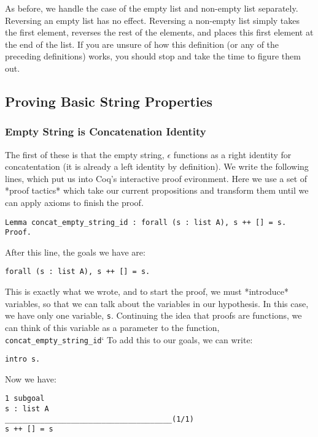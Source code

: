 As before, we handle the case of the empty list and non-empty list separately.
Reversing an empty list has no effect.
Reversing a non-empty list simply takes the first element, reverses the rest of the elements, and places this first element at the end of the list.
If you are unsure of how this definition (or any of the preceding definitions) works, you should stop and take the time to figure them out.

\subsection{Proving Basic String Properties}

\subsubsection{Empty String is Concatenation Identity}

The first of these is that the empty string, $\epsilon$ functions as a right identity for concatentation (it is already a left identity by definition).
We write the following lines, which put us into Coq's interactive proof evironment.
Here we use a set of *proof tactics* which take our current propositions and transform them until we can apply axioms to finish the proof.

\begin{verbatim}
Lemma concat_empty_string_id : forall (s : list A), s ++ [] = s.
Proof.
\end{verbatim}

After this line, the goals we have are:

\begin{verbatim}
forall (s : list A), s ++ [] = s.
\end{verbatim}

This is exactly what we wrote, and to start the proof, we must *introduce* variables, so that we can talk about the variables in our hypothesis.
In this case, we have only one variable, \texttt{s}.
Continuing the idea that proofs are functions, we can think of this variable as a parameter to the function, \texttt{concat_empty_string_id}`
To add this to our goals, we can write:

\begin{verbatim}
intro s.
\end{verbatim}

Now we have:

\begin{verbatim}
1 subgoal
s : list A
______________________________________(1/1)
s ++ [] = s
\end{verbatim}

